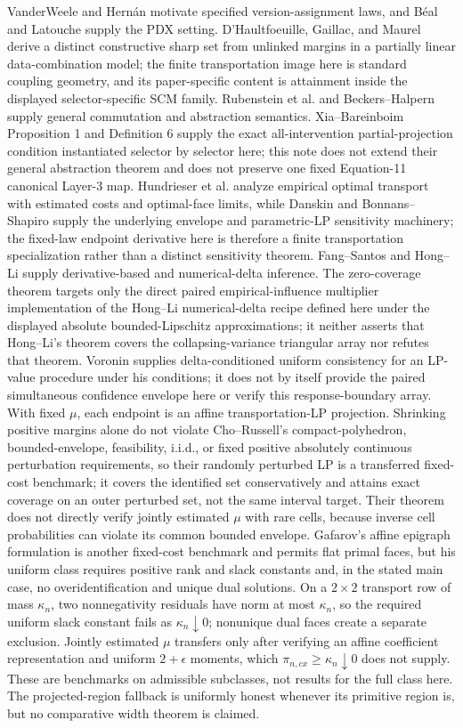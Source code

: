 \documentclass{article}
\begin{document}
VanderWeele and Hernán motivate specified version-assignment laws, and Béal and Latouche supply the PDX setting. D'Haultfoeuille, Gaillac, and Maurel derive a distinct constructive sharp set from unlinked margins in a partially linear data-combination model; the finite transportation image here is standard coupling geometry, and its paper-specific content is attainment inside the displayed selector-specific SCM family. Rubenstein et al. and Beckers--Halpern supply general commutation and abstraction semantics. Xia--Bareinboim Proposition 1 and Definition 6 supply the exact all-intervention partial-projection condition instantiated selector by selector here; this note does not extend their general abstraction theorem and does not preserve one fixed Equation-11 canonical Layer-3 map. Hundrieser et al. analyze empirical optimal transport with estimated costs and optimal-face limits, while Danskin and Bonnans--Shapiro supply the underlying envelope and parametric-LP sensitivity machinery; the fixed-law endpoint derivative here is therefore a finite transportation specialization rather than a distinct sensitivity theorem. Fang--Santos and Hong--Li supply derivative-based and numerical-delta inference. The zero-coverage theorem targets only the direct paired empirical-influence multiplier implementation of the Hong--Li numerical-delta recipe defined here under the displayed absolute bounded-Lipschitz approximations; it neither asserts that Hong--Li's theorem covers the collapsing-variance triangular array nor refutes that theorem. Voronin supplies delta-conditioned uniform consistency for an LP-value procedure under his conditions; it does not by itself provide the paired simultaneous confidence envelope here or verify this response-boundary array. With fixed \(\mu\), each endpoint is an affine transportation-LP projection. Shrinking positive margins alone do not violate Cho--Russell's compact-polyhedron, bounded-envelope, feasibility, i.i.d., or fixed positive absolutely continuous perturbation requirements, so their randomly perturbed LP is a transferred fixed-cost benchmark; it covers the identified set conservatively and attains exact coverage on an outer perturbed set, not the same interval target. Their theorem does not directly verify jointly estimated \(\mu\) with rare cells, because inverse cell probabilities can violate its common bounded envelope. Gafarov's affine epigraph formulation is another fixed-cost benchmark and permits flat primal faces, but his uniform class requires positive rank and slack constants and, in the stated main case, no overidentification and unique dual solutions. On a \(2\times2\) transport row of mass \(\kappa_n\), two nonnegativity residuals have norm at most \(\kappa_n\), so the required uniform slack constant fails as \(\kappa_n\downarrow0\); nonunique dual faces create a separate exclusion. Jointly estimated \(\mu\) transfers only after verifying an affine coefficient representation and uniform \(2+\epsilon\) moments, which \(\pi_{n,cx}\geq\kappa_n\downarrow0\) does not supply. These are benchmarks on admissible subclasses, not results for the full class here. The projected-region fallback is uniformly honest whenever its primitive region is, but no comparative width theorem is claimed.
\end{document}
